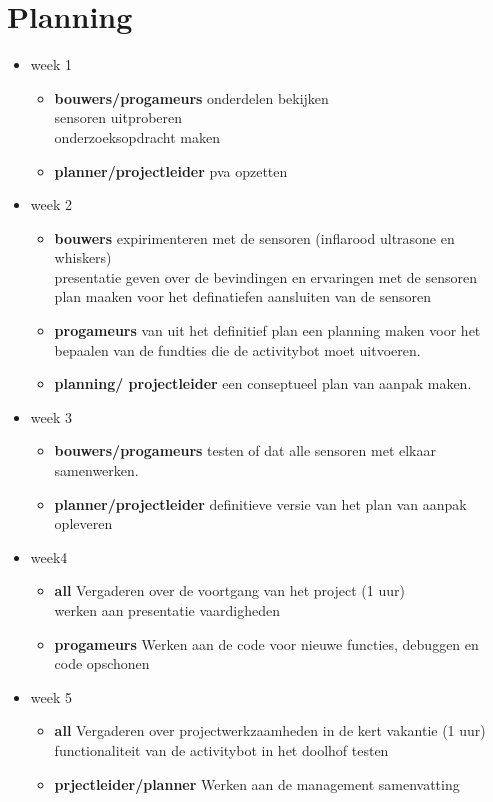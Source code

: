 \documentclass[oneside]{book}
\begin{document}
\chapter{Planning}
\begin{itemize}
\item week 1 
	\begin{itemize}		
	\item \textbf{bouwers/progameurs}
		onderdelen bekijken\\
		sensoren uitproberen\\
		onderzoeksopdracht maken\\
	\item \textbf{planner/projectleider}
		pva opzetten
	\end{itemize}
\item week 2
	\begin{itemize}	
	\item \textbf{bouwers}
		expirimenteren met de sensoren (inflarood ultrasone en whiskers)\\
		presentatie geven over de bevindingen en ervaringen met de sensoren\\
		plan maaken voor het definatiefen aansluiten van de sensoren
	\item \textbf{progameurs}
		van uit het definitief plan een planning maken voor het bepaalen van de fundties die de activitybot moet uitvoeren.
	\item \textbf{planning/ projectleider}
		een conseptueel plan van aanpak maken.
	\end{itemize}
\item week 3
	\begin{itemize}	
	\item \textbf{bouwers/progameurs} 
		testen of dat alle sensoren met elkaar samenwerken.
	\item \textbf{planner/projectleider}
		definitieve versie van het plan van aanpak opleveren
	\end{itemize}
\item week4
	\begin{itemize}	
	\item \textbf{all}
		Vergaderen over de voortgang van het project (1 uur)\\
		werken aan presentatie vaardigheden	
	\item \textbf{progameurs}
		Werken aan de code voor nieuwe functies, debuggen en code opschonen
	\end{itemize}
\item week 5
	\begin{itemize}	
	\item \textbf{all}
		Vergaderen over projectwerkzaamheden in de kert vakantie (1 uur)\\
		functionaliteit van de activitybot in het doolhof testen
	\item \textbf{prjectleider/planner}
		Werken aan de management samenvatting
	\end{itemize}


\end{itemize}
\end{document}
